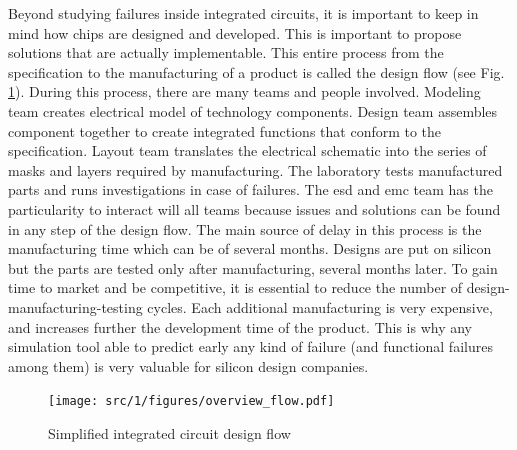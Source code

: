 Beyond studying failures inside integrated circuits, it is important to keep in mind how chips are designed and developed.
This is important to propose solutions that are actually implementable.
This entire process from the specification to the manufacturing of a product is called the design flow (see Fig. \ref{fig:ic-design-flow}).
During this process, there are many teams and people involved.
Modeling team creates electrical model of technology components.
Design team assembles component together to create integrated functions that conform to the specification.
Layout team translates the electrical schematic into the series of masks and layers required by manufacturing.
The laboratory tests manufactured parts and runs investigations in case of failures.
The \gls{esd} and \gls{emc} team has the particularity to interact will all teams because issues and solutions can be found in any step of the design flow.
The main source of delay in this process is the manufacturing time which can be of several months.
Designs are put on silicon but the parts are tested only after manufacturing, several months later.
To gain time to market and be competitive, it is essential to reduce the number of design-manufacturing-testing cycles.
Each additional manufacturing is very expensive, and increases further the development time of the product.
This is why any simulation tool able to predict early any kind of failure (and functional failures among them) is very valuable for silicon design companies.

\begin{figure}[!h]
  \centering
  \texttt{[image: src/1/figures/overview\_flow.pdf]}
  \caption{Simplified integrated circuit design flow}
  \label{fig:ic-design-flow}
\end{figure}

